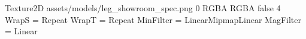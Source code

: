 Texture2D
assets/models/leg_showroom_spec.png
0
RGBA
RGBA
false
4
WrapS = Repeat
WrapT = Repeat
MinFilter = LinearMipmapLinear
MagFilter = Linear
